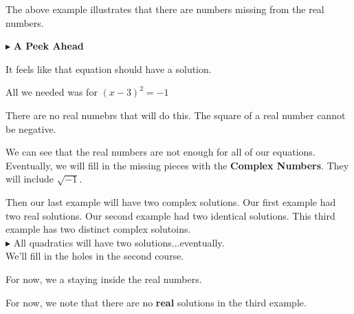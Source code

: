 \documentclass{ximera}
\begin{document}
The above example illustrates that there are numbers missing from the real numbers.  


$\blacktriangleright$  \textbf{\textcolor{purple!85!blue}{A Peek Ahead}} 



It feels like that equation should have a solution.  


All we needed was for $(x-3)^2 = -1$ 

There are no real numebrs that will do this.  The square of a real number cannot be negative. 




We can see that the real numbers are not enough for all of our equations.  Eventually, we will fill in the missing pieces with the \textbf{Complex Numbers}.  They will include $\sqrt{-1}$. 


Then our last example will have two complex solutions.  Our first example had two real solutions.  Our second example had two identical solutions.  This third example has two distinct complex solutoins. \\


$\blacktriangleright$ All quadratics will have two solutions...eventually. \\

We'll fill in the holes in the second course.









For now, we a staying inside the real numbers.



 For now, we note that there are no \textbf{real} solutions in the third example.
\end{document}

